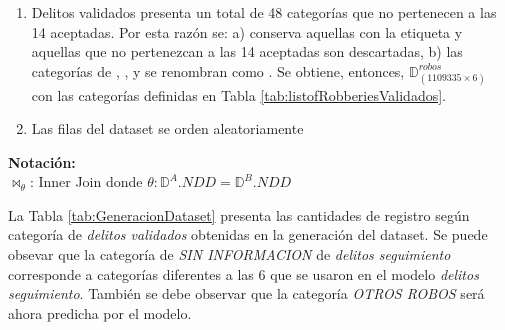 \documentclass[onecolumn, journal, english, 12pt, a4paper]{IEEEtran} %
\theoremstyle{definition}
\begin{document}
\begin{enumerate}
        \item Delitos validados presenta un total de 48 categorías que
          no pertenecen a las 14 aceptadas. Por esta razón se: a)
          conserva aquellas con la etiqueta  y
          aquellas que no pertenezcan a las 14 aceptadas son
          descartadas, b) las categorías de , , y
           se renombran como
          . Se obtiene, entonces,
          $\mathbb{D}^{robos}_{(1109335 \times 6)}$ con las categorías
          definidas en Tabla \ref{tab:listofRobberiesValidados}.
        \item Las filas del dataset se orden aleatoriamente
    \end{enumerate}

\textbf{Notación:}\\
$\bowtie_\theta$: Inner Join donde $\theta:\mathbb{D}^A.NDD=\mathbb{D}^B.NDD$ 


La Tabla \ref{tab:GeneracionDataset} presenta las cantidades de
registro según categoría de \emph{delitos validados} obtenidas en la
generación del dataset. Se puede obsevar que la categoría de \emph{SIN
  INFORMACION} de \emph{delitos seguimiento} corresponde a categorías
diferentes a las 6 que se usaron en el modelo \emph{delitos
  seguimiento}. También se debe observar que la categoría \emph{OTROS
  ROBOS} será ahora predicha por el modelo.
\end{document}
